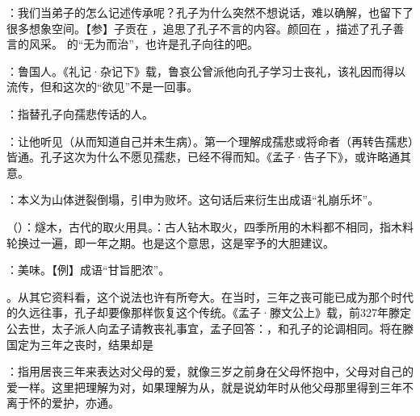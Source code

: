 {
\item {}：我们当弟子的怎么记述传承呢？孔子为什么突然不想说话，难以确解，也留下了很多想象空间。【参】子贡在 ，追思了孔子不言的内容。颜回在 ，描述了孔子善言的风采。 的“无为而治”，也许是孔子向往的吧。
}
{}


{
\item {}：鲁国人。《礼记·杂记下》载，鲁哀公曾派他向孔子学习士丧礼，该礼因而得以流传，但和这次的“欲见”不是一回事。
\item {}：指替孔子向孺悲传话的人。
\item {}：让他听见（从而知道自己并未生病）。第一个理解成孺悲或将命者（再转告孺悲）皆通。孔子这次为什么不愿见孺悲，已经不得而知。《孟子·告子下》，或许略通其意。%
}
{}


{
\item {}：本义为山体迸裂倒塌，引申为败坏。这句话后来衍生出成语“礼崩乐坏”。
\item {}（）：燧木，古代的取火用具。：古人钻木取火，四季所用的木料都不相同，指木料轮换过一遍，即一年之期。也是这个意思，这是宰予的大胆建议。
\item {}：美味。【例】成语“甘旨肥浓”。
\item {}。从其它资料看，这个说法也许有所夸大。在当时，三年之丧可能已成为那个时代的久远往事，孔子却要像那样恢复这个传统。《孟子·滕文公上》载，前327年滕定公去世，太子派人向孟子请教丧礼事宜，孟子回答：，和孔子的论调相同。将在滕国定为三年之丧时，结果却是
\item {}：指用居丧三年来表达对父母的爱，就像三岁之前身在父母怀抱中，父母对自己的爱一样。这里把理解为对，如果理解为从，就是说幼年时从他父母那里得到三年不离于怀的爱护，亦通。
}
{}


